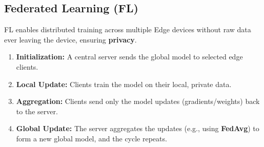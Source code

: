 \subsection{Federated Learning (FL)}
FL enables distributed training across multiple Edge devices without raw data ever leaving the device, ensuring \textbf{privacy}.
\begin{enumerate}
    \item \textbf{Initialization:} A central server sends the global model to selected edge clients.
    \item \textbf{Local Update:} Clients train the model on their local, private data.
    \item \textbf{Aggregation:} Clients send only the model updates (gradients/weights) back to the server.
    \item \textbf{Global Update:} The server aggregates the updates (e.g., using \textbf{FedAvg}) to form a new global model, and the cycle repeats.
\end{enumerate}
